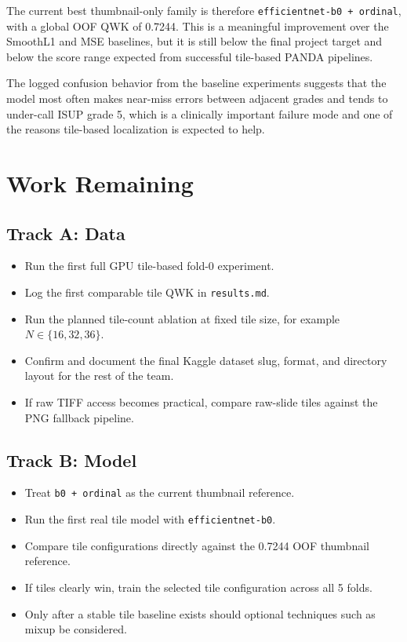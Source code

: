 \documentclass[11pt]{article}
\begin{document}
The current best thumbnail-only family is therefore \texttt{efficientnet-b0 + ordinal}, with a global OOF QWK of 0.7244. This is a meaningful improvement over the SmoothL1 and MSE baselines, but it is still below the final project target and below the score range expected from successful tile-based PANDA pipelines.

The logged confusion behavior from the baseline experiments suggests that the model most often makes near-miss errors between adjacent grades and tends to under-call ISUP grade 5, which is a clinically important failure mode and one of the reasons tile-based localization is expected to help.

\section{Work Remaining}

\subsection{Track A: Data}

\begin{itemize}[leftmargin=*]
    \item Run the first full GPU tile-based fold-0 experiment.
    \item Log the first comparable tile QWK in \texttt{results.md}.
    \item Run the planned tile-count ablation at fixed tile size, for example $N \in \{16,32,36\}$.
    \item Confirm and document the final Kaggle dataset slug, format, and directory layout for the rest of the team.
    \item If raw TIFF access becomes practical, compare raw-slide tiles against the PNG fallback pipeline.
\end{itemize}

\subsection{Track B: Model}

\begin{itemize}[leftmargin=*]
    \item Treat \texttt{b0 + ordinal} as the current thumbnail reference.
    \item Run the first real tile model with \texttt{efficientnet-b0}.
    \item Compare tile configurations directly against the 0.7244 OOF thumbnail reference.
    \item If tiles clearly win, train the selected tile configuration across all 5 folds.
    \item Only after a stable tile baseline exists should optional techniques such as mixup be considered.
\end{itemize}
\end{document}
